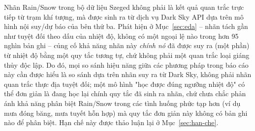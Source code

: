 Nhãn Rain/Snow trong bộ dữ liệu Szeged không phải là kết quả quan trắc trực tiếp từ trạm
khí tượng, mà được sinh ra từ dịch vụ Dark Sky API dựa trên mô hình nội suy/dự báo của
bên thứ ba. Phát hiện ở Mục~\ref{sec:eda} -- nhãn tách gần như tuyệt đối theo dấu của
nhiệt độ, không có một ngoại lệ nào trong hơn 95 nghìn bản ghi -- củng cố khả năng nhãn này
\emph{chính nó} đã được suy ra (một phần) từ nhiệt độ bằng một quy tắc tương tự, chứ không
phải một quan trắc loại giáng thủy độc lập. Do đó, mọi so sánh hiệu năng giữa các phương
pháp trong báo cáo này cần được hiểu là so sánh dựa trên nhãn suy ra từ Dark Sky, không
phải nhãn quan trắc thực địa tuyệt đối; một mô hình "học được đúng ngưỡng nhiệt độ" có thể
đơn giản là đang học lại chính quy tắc đã sinh ra nhãn, chứ chưa chắc phản ánh khả năng
phân biệt Rain/Snow trong các tình huống phức tạp hơn (ví dụ mưa đóng băng, mưa tuyết hỗn
hợp) mà quy tắc đơn giản này không có bản ghi nào để phân biệt. Hạn chế này được thảo luận
lại ở Mục~\ref{sec:han-che}.
